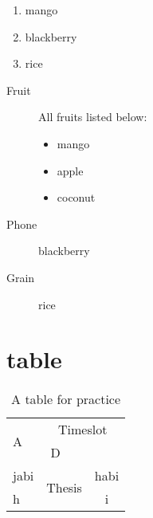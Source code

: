 \documentclass{article}
\begin{document}
\begin{enumerate}[i]
	\item mango
	\item blackberry
	\item rice
\end{enumerate}

\begin{description}
	\item[Fruit] All fruits listed below:
	\begin{itemize}
		\item mango
		\item apple
		\item coconut
	\end{itemize}
	\item[Phone] blackberry
	\item[Grain] rice
\end{description}


\section{table}

\begin{table}[h] %
\centering
\begin{tabular}{|l|c|r|c|}
\hline
\multirow{2}{*}{A} & \multicolumn{3}{c|}{Timeslot} \\
\cline{2-4}
 & D & & \\
\hline
 jabi & \multicolumn{2}{c}{\multirow{2}{*}{Thesis}} & habi \\
\cline{4-4}
h & \multicolumn{2}{c}{} & i\\
\end{tabular}
\caption{A table for practice}
\label{table}
\end{table}
\end{document}
